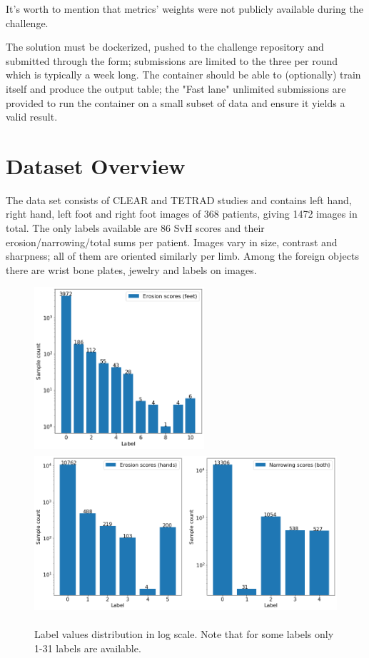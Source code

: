 \documentclass[thesis=B,english]{FITthesis}[2019/12/23]
\begin{document}
It's worth to mention that metrics' weights were not publicly available during the challenge.

The solution must be dockerized, pushed to the challenge repository and submitted through the form; submissions are limited to the three per round which is typically a week long. The container should be able to (optionally) train itself and produce the output table; the "Fast lane" unlimited submissions are provided to run the container on a small subset of data and ensure it yields a valid result.

\section{Dataset Overview}

The data set consists of CLEAR and TETRAD studies and contains left hand, right hand, left foot and right foot images of 368 patients, giving 1472 images in total. The only labels available are 86 SvH scores and their erosion/narrowing/total sums per patient. Images vary in size, contrast and sharpness; all of them are oriented similarly per limb. Among the foreign objects there are wrist bone plates, jewelry and labels on images.

\begin{figure}[h]
	\centering
	\includegraphics[height=6cm]{images/sample_counts_fe.png}
	\includegraphics[height=6cm]{images/sample_counts_rest.png}
	\caption{Label values distribution in log scale. Note that for some labels only 1-31 labels are available.}
\end{figure}
\end{document}
